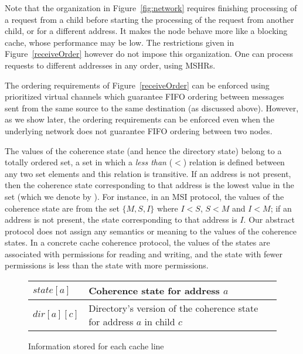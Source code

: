 Note that the organization in Figure~\ref{fig:network} requires finishing
processing of a request from a child before starting the processing of the
request from another child, or for a different address. It makes the node
behave more like a blocking cache, whose performance may be low. The
restrictions given in Figure~\ref{receiveOrder} however do not impose this
organization. One can process requests to different addresses in any order,
using MSHRs.

The ordering requirements of Figure~\ref{receiveOrder} can be enforced using
prioritized virtual channels which guarantee FIFO ordering between messages
sent from the same source to the same destination (as discussed above).
However, as we show later, the ordering requirements can be enforced even when
the underlying network does not guarantee FIFO ordering between two nodes.

The values of the coherence state (and hence the directory state) belong to a
totally ordered set, \ie a set in which a \emph{less than} ($<$) relation is
defined between any two set elements and this relation is transitive. If an
address is not present, then the coherence state corresponding to that address
is the lowest value in the set (which we denote by \Inv). For instance, in an
MSI protocol, the values of the coherence state are from the set $\{M, S, I\}$
where $I < S$, $S < M$ and $I < M$; if an address is not present, the state
corresponding to that address is $I$. Our abstract protocol does not assign any
semantics or meaning to the values of the coherence states. In a concrete cache
coherence protocol, the values of the states are associated with permissions
for reading and writing, and the state with fewer permissions is less than the
state with more permissions.

\begin{figure}\centering
\begin{tabularx}{\linewidth}{|l|X|}
\hline
$state[a]$ & Coherence state for address $a$\\
\hline
$dir[a][c]$ & Directory's version of the coherence state for address $a$ in child
$c$\\
\hline
\end{tabularx}
\caption{Information stored for each cache line}
\label{table:storage}
\end{figure}

